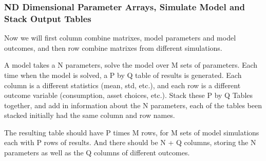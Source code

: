 \documentclass[
]{book}
\begin{document}
\hypertarget{nd-dimensional-parameter-arrays-simulate-model-and-stack-output-tables}{%
\subsubsection{ND Dimensional Parameter Arrays, Simulate Model and Stack Output Tables}\label{nd-dimensional-parameter-arrays-simulate-model-and-stack-output-tables}}

Now we will first column combine matrixes, model parameters and model
outcomes, and then row combine matrixes from different simulations.

A model takes a N parameters, solve the model over M sets of parameters.
Each time when the model is solved, a P by Q table of results is
generated. Each column is a different statistics (mean, std, etc.), and
each row is a different outcome variable (consumption, asset choices,
etc.). Stack these P by Q Tables together, and add in information about
the N parameters, each of the tables been stacked initially had the same
column and row names.

The resulting table should have P times M rows, for M sets of model
simulations each with P rows of results. And there should be N + Q
columns, storing the N parameters as well as the Q columns of different
outcomes.
\end{document}
